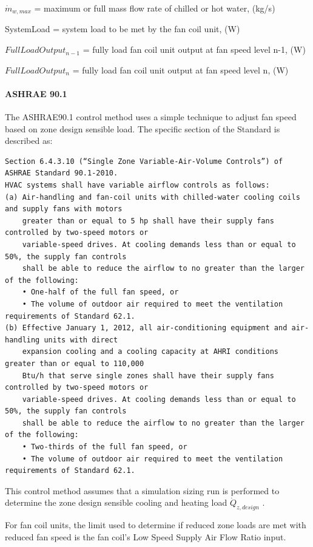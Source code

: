 $\dot{m}_{w, max}$ = maximum or full mass flow rate of chilled or hot water, (kg/s)

SystemLoad = system load to be met by the fan coil unit, (W)

$FullLoadOutput_{n-1}$ = fully load fan coil unit output at fan speed level n-1, (W)

$FullLoadOutput_{n}$ = fully load fan coil unit output at fan speed level n, (W)

\paragraph{ASHRAE 90.1}\label{ashrae-90.1}

The ASHRAE90.1 control method uses a simple technique to adjust fan speed based on zone design sensible load. The specific section of the Standard is described as:

\begin{lstlisting}
Section 6.4.3.10 (“Single Zone Variable-Air-Volume Controls”) of ASHRAE Standard 90.1-2010.
HVAC systems shall have variable airflow controls as follows:
(a) Air-handling and fan-coil units with chilled-water cooling coils and supply fans with motors 
    greater than or equal to 5 hp shall have their supply fans controlled by two-speed motors or
    variable-speed drives. At cooling demands less than or equal to 50%, the supply fan controls
    shall be able to reduce the airflow to no greater than the larger of the following:
    • One-half of the full fan speed, or
    • The volume of outdoor air required to meet the ventilation requirements of Standard 62.1.
(b) Effective January 1, 2012, all air-conditioning equipment and air-handling units with direct
    expansion cooling and a cooling capacity at AHRI conditions greater than or equal to 110,000
    Btu/h that serve single zones shall have their supply fans controlled by two-speed motors or
    variable-speed drives. At cooling demands less than or equal to 50%, the supply fan controls
    shall be able to reduce the airflow to no greater than the larger of the following:
    • Two-thirds of the full fan speed, or
    • The volume of outdoor air required to meet the ventilation requirements of Standard 62.1.
\end{lstlisting}

This control method assumes that a simulation sizing run is performed to determine the zone design sensible cooling and heating load \({\dot Q_{z,design}}\) .

For fan coil units, the limit used to determine if reduced zone loads are met with reduced fan speed is the fan coil's Low Speed Supply Air Flow Ratio input.

